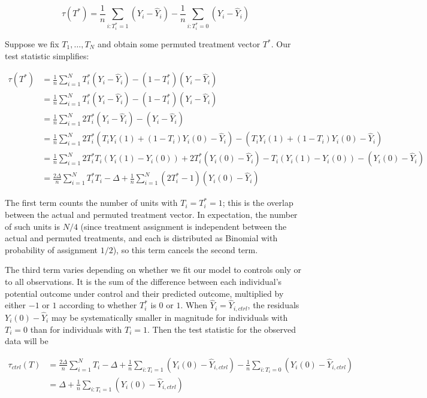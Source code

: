 \begin{equation}
\tau(T^*) = \frac{1}{n} \sum_{i: T_i^* =1}(Y_i - \hat{Y}_i) - \frac{1}{n} \sum_{i: T_i^* = 0} (Y_i - \hat{Y}_i)
\end{equation}

Suppose we fix $T_1, \dots, T_N$ and obtain some permuted treatment vector $T^*$.
Our test statistic simplifies:

\begin{align*}
\tau(T^*) &= \frac{1}{n} \sum_{i=1}^N T_i^* (Y_i - \hat{Y}_i) - (1-T_i^*)(Y_i - \hat{Y}_i) \\
&= \frac{1}{n} \sum_{i=1}^N T_i^* (Y_i - \hat{Y}_i) - (1-T_i^*)(Y_i - \hat{Y}_i) \\
&= \frac{1}{n} \sum_{i=1}^N 2T_i^* (Y_i - \hat{Y}_i) - (Y_i - \hat{Y}_i) \\
&= \frac{1}{n} \sum_{i=1}^N 2T_i^* (T_iY_i(1) + (1-T_i)Y_i(0) - \hat{Y}_i) - (T_iY_i(1) + (1-T_i)Y_i(0) - \hat{Y}_i) \\
&= \frac{1}{n} \sum_{i=1}^N 2T_i^*T_i (Y_i(1) - Y_i(0)) + 2T_i^*(Y_i(0) - \hat{Y}_i) - T_i (Y_i(1) - Y_i(0)) - (Y_i(0) - \hat{Y}_i) \\
&= \frac{2\Delta}{n} \sum_{i=1}^N T_i^* T_i - \Delta + \frac{1}{n} \sum_{i=1}^N (2T_i^* - 1)(Y_i(0) - \hat{Y}_i)
\end{align*}

The first term counts the number of units with $T_i = T_i^* = 1$; this is the overlap between the actual and permuted treatment vector.
In expectation, the number of such units is $N/4$ (since treatment assignment is independent between the actual and permuted treatments, and each is distributed as Binomial with probability of assignment $1/2$), so this term cancels the second term.

The third term varies depending on whether we fit our model to controls only or to all observations.  It is the sum of the difference between each individual's potential outcome under control and their predicted outcome, multiplied by either $-1$ or $1$ according to whether $T_i^*$ is $0$ or $1$.
When $\hat{Y}_i = \hat{Y}_{i, ctrl}$, the residuals $Y_i(0) - \hat{Y}_i$ may be systematically smaller in magnitude for individuals with $T_i=0$ than for individuals with $T_i=1$. Then the test statistic for the observed data will be

\begin{align*}
\tau_{ctrl}(T) &= \frac{2\Delta}{n}\sum_{i=1}^N T_i - \Delta + \frac{1}{n}\sum_{i: T_i=1} (Y_i(0) - \hat{Y}_{i, ctrl}) - \frac{1}{n}\sum_{i: T_i=0} (Y_i(0) - \hat{Y}_{i, ctrl}) \\
&= \Delta + \frac{1}{n}\sum_{i: T_i=1} (Y_i(0) - \hat{Y}_{i, ctrl})
\end{align*}

